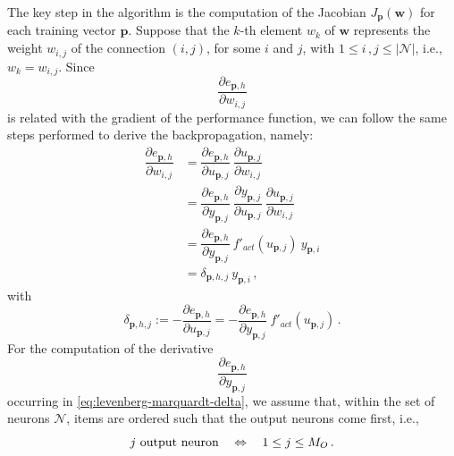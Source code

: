 \documentclass[12pt, a4paper, twoside, openright, notitlepage]{report}
\numberwithin{equation}{chapter}
\theoremstyle{theorem}
\theoremstyle{definition}
\theoremstyle{remark}
\theoremstyle{proposition}
\numberwithin{figure}{chapter}
\begin{document}
		The key step in the algorithm is the computation of the Jacobian $J_{\mathbf{p}}(\mathbf{w})$ for each training vector $\mathbf{p}$. Suppose that the $k$-th element $w_k$ of $\mathbf{w}$ represents the weight $w_{i,j}$ of the connection $(i,j)$, for some $i$ and $j$, with $1 \leq i \, , j \leq |\mathcal{N}|$, i.e., $w_k = w_{i,j}$. Since
		\begin{equation*}
			\dfrac{\partial e_{\mathbf{p},h}}{\partial w_{i,j}}
		\end{equation*}
		is related with the gradient of the performance function, we can follow the same steps performed to derive the backpropagation, namely:
		\begin{equation}
			\label{eq:jacobian-entry-equation}
			\begin{aligned}
				\dfrac{\partial e_{\mathbf{p},h}}{\partial w_{i,j}} & = \dfrac{\partial e_{\mathbf{p},h}}{\partial u_{\mathbf{p},j}} ~ \dfrac{\partial u_{\mathbf{p},j}}{\partial w_{i,j}} \\[0.1cm]
				& = \dfrac{\partial e_{\mathbf{p},h}}{\partial y_{\mathbf{p},j}} ~ \dfrac{\partial y_{\mathbf{p},j}}{\partial u_{\mathbf{p},j}} ~ \dfrac{\partial u_{\mathbf{p},j}}{\partial w_{i,j}} \\[0.1cm]
				& = \dfrac{\partial e_{\mathbf{p},h}}{\partial y_{\mathbf{p},j}} ~ f'_{act}(u_{\mathbf{p},j}) ~ y_{\mathbf{p},i} \\
				& = \delta_{\mathbf{p},h,j} ~ y_{\mathbf{p},i} \, ,
			\end{aligned}
		\end{equation} 
		with
		\begin{equation}
			\label{eq:levenberg-marquardt-delta}
			\delta_{\mathbf{p},h,j} := - \dfrac{\partial e_{\mathbf{p},h}}{\partial u_{\mathbf{p},j}} = - \dfrac{\partial e_{\mathbf{p},h}}{\partial y_{\mathbf{p},j}} ~ f'_{act}(u_{\mathbf{p},j}) \, .
		\end{equation}
		For the computation of the derivative 
		\begin{equation*}
			\dfrac{\partial e_{\mathbf{p},h}}{\partial y_{\mathbf{p},j}}
		\end{equation*}
		occurring in \eqref{eq:levenberg-marquardt-delta}, we assume that, within the set of neurons $\mathcal{N}$, items are ordered such that the output neurons come first, i.e.,
		\begin{equation*}
			\text{$j$ output neuron \hspace*{0.2cm} $\Leftrightarrow$ \hspace*{0.2cm} $1 \leq j \leq M_O$} \, .
		\end{equation*} 
\end{document}
